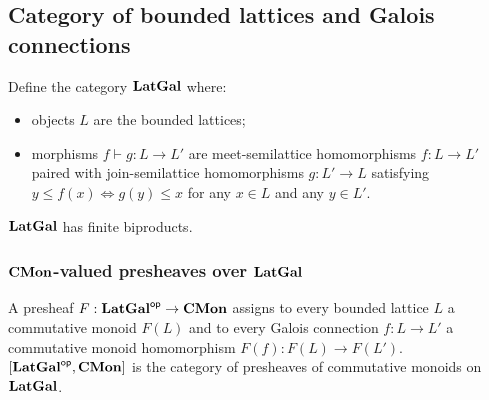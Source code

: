 \subsection{Category of bounded lattices and Galois connections}
\label{sec:galois}

Define the category $\mathbf{LatGal}$ where:
\begin{itemize}
\item objects $L$ are the bounded lattices;
\item morphisms $f \vdash g: L \to L'$ are meet-semilattice homomorphisms $f: L \to L'$ paired with
join-semilattice homomorphisms $g: L' \to L$ satisfying $y \leq f(x) \iff g(y) \leq x$ for any $x \in L$ and any
$y \in L'$.
\end{itemize}

\noindent $\mathbf{LatGal}$ has finite biproducts.

\subsubsection{$\mathbf{CMon}$-valued presheaves over $\mathbf{LatGal}$}

A presheaf $F: \mathbf{LatGal}^{\mathsf{op}} \to \mathbf{CMon}$ assigns to every bounded lattice $L$ a commutative monoid $F(L)$ and to
every Galois connection $f: L \to L'$ a commutative monoid homomorphism $F(f): F(L) \to F(L')$.
$[\mathbf{LatGal}^{\mathsf{op}},\mathbf{CMon}]$ is the category of presheaves of commutative monoids on $\mathbf{LatGal}$.
